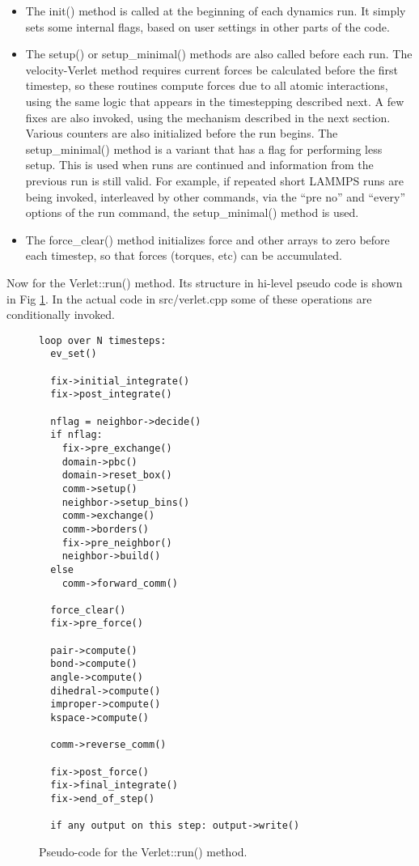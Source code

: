 \documentclass{article}
\begin{document}
\begin{itemize}

\item The init() method is called at the beginning of each dynamics
  run.  It simply sets some internal flags, based on user settings in
  other parts of the code.

\item The setup() or setup\_minimal() methods are also called before
  each run.  The velocity-Verlet method requires current forces be
  calculated before the first timestep, so these routines compute
  forces due to all atomic interactions, using the same logic that
  appears in the timestepping described next.  A few fixes are also
  invoked, using the mechanism described in the next section.  Various
  counters are also initialized before the run begins.  The
  setup\_minimal() method is a variant that has a flag for performing
  less setup.  This is used when runs are continued and information
  from the previous run is still valid.  For example, if repeated
  short LAMMPS runs are being invoked, interleaved by other commands,
  via the ``pre no'' and ``every'' options of the run command, the
  setup\_minimal() method is used.

\item The force\_clear() method initializes force and other arrays to
  zero before each timestep, so that forces (torques, etc) can be
  accumulated.

\end{itemize}

Now for the Verlet::run() method.  Its structure in hi-level pseudo
code is shown in Fig \ref{fig:verlet}.  In the actual code in
src/verlet.cpp some of these operations are conditionally invoked.

\begin{figure}[htb]
 \begin{center}
 \begin{verbatim}
loop over N timesteps:
  ev_set()

  fix->initial_integrate()
  fix->post_integrate()

  nflag = neighbor->decide()
  if nflag:
    fix->pre_exchange()
    domain->pbc()
    domain->reset_box()
    comm->setup()
    neighbor->setup_bins()
    comm->exchange()
    comm->borders()
    fix->pre_neighbor()
    neighbor->build()
  else
    comm->forward_comm()

  force_clear()
  fix->pre_force()

  pair->compute()
  bond->compute()
  angle->compute()
  dihedral->compute()
  improper->compute()
  kspace->compute()

  comm->reverse_comm()

  fix->post_force()
  fix->final_integrate()
  fix->end_of_step()

  if any output on this step: output->write()
  \end{verbatim}
 \end{center}
 \caption{Pseudo-code for the Verlet::run() method.}
\label{fig:verlet}
\end{figure}
\end{document}

